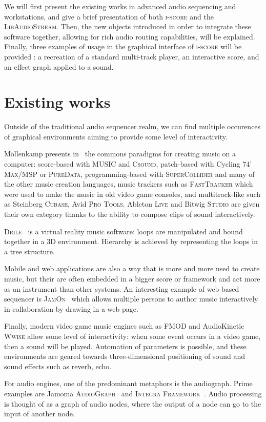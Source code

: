 \documentclass{article}
\newcommand*{\LibAudioStream}{\textsc{LibAudioStream}\xspace}
\newcommand*{\iscore}{\textsc{i-score}\xspace}
\newcommand*{\maxmsp}{Cycling 74' \textsc{Max/MSP}\xspace}
\newcommand*{\puredata}{\textsc{PureData}\xspace}
\newcommand*{\csound}{\textsc{Csound}\xspace}
\newcommand*{\supercollider}{\textsc{SuperCollider}\xspace}
\newcommand*{\abletonlive}{Ableton \textsc{Live}\xspace}
\newcommand*{\bitwigstudio}{Bitwig \textsc{Studio}\xspace}
\newcommand*{\fasttracker}{\textsc{FastTracker}\xspace}
\newcommand*{\cubase}{Steinberg \textsc{Cubase}\xspace}
\newcommand*{\protools}{Avid \textsc{Pro Tools}\xspace}
\newcommand*{\jamomaaudiograph}{Jamoma \textsc{AudioGraph}\xspace}
\newcommand*{\integraframework}{\textsc{Integra Framework}\xspace}
\newcommand*{\MUSIC}{\textsc{MUSIC}\xspace}
\newcommand*{\drile}{\textsc{Drile}\xspace}
\newcommand*{\jamon}{\textsc{JamOn}\xspace}
\newcommand*{\wwise}{AudioKinetic \textsc{Wwise}\xspace}
\newcommand*{\fmod}{\textsc{FMOD}\xspace}
\begin{document}
We will first present the existing works in advanced audio sequencing and workstations, 
and give a brief presentation of both \iscore and the \LibAudioStream.
Then, the new objects introduced in order to integrate these software together, allowing 
for rich audio routing capabilities, will be explained.
Finally, three examples of usage in the graphical interface of \iscore will be provided : a recreation of a standard multi-track player, an interactive score, and an effect graph applied to a sound.

\section{Existing works}
Outside of the traditional audio sequencer realm, we can find 
multiple occurences of graphical environments aiming to provide 
some level of interactivity.

M{\"o}llenkamp presents in~\cite{mollenkampparadigms} the 
commons paradigms for creating music on a computer: score-based with \MUSIC and \csound, 
patch-based with \maxmsp or \puredata, programming-based with \supercollider and many of the other music creation languages, music trackers such as \fasttracker which were used to make the music in old video game consoles, and multitrack-like such as \cubase, \protools.
\abletonlive and \bitwigstudio are given their own category thanks to the ability to compose clips of sound interactively.

\drile~\cite{berthaut2010drile} is a virtual reality music software: loops are manipulated and bound together in a 3D environment. Hierarchy is achieved by representing the loops in a tree structure.

Mobile and web applications are also a way that is more and more used to create music, 
but their are often embedded in a bigger score or framework and act more as an instrument than other systems.
An interesting example of web-based sequencer is \jamon~\cite{rosselet2013jam} which allows multiple persons to author music interactively in collaboration by drawing in a web page.

Finally, modern video game music engines such as \fmod and \wwise allow some level of interactivity: when some event occurs in a video game, then a sound will be played. 
Automation of parameters is possible, and these environments are geared towards three-dimensional positioning of sound and sound effects such as reverb, echo.

For audio engines, one of the predominant metaphors is the audiograph.
Prime examples are \jamomaaudiograph~\cite{place2010jamoma} and \integraframework~\cite{bullock2011integra}.
Audio processing is thought of as a graph of audio nodes, where the output of a node can go to the input of another node.
\end{document}

